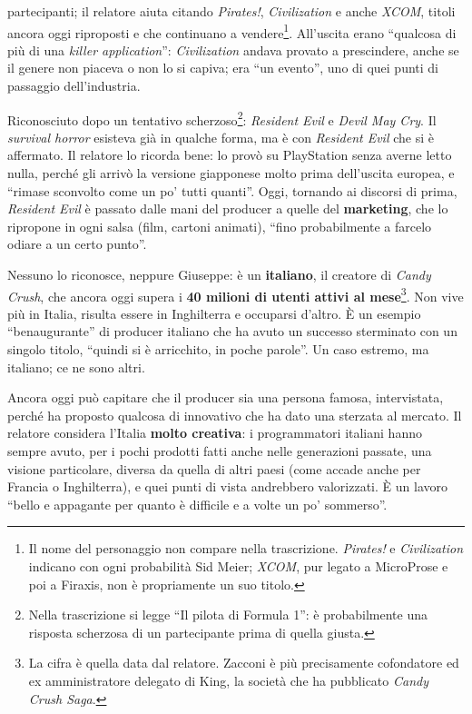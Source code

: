 \begin{description}
        partecipanti; il relatore aiuta citando \emph{Pirates!},
        \emph{Civilization} e anche \emph{XCOM}, titoli ancora oggi riproposti e
        che continuano a vendere\footnote{Il nome del personaggio non compare
        nella trascrizione. \emph{Pirates!} e \emph{Civilization} indicano con
        ogni probabilità Sid Meier; \emph{XCOM}, pur legato a MicroProse e poi a
        Firaxis, non è propriamente un suo titolo.}. All'uscita erano ``qualcosa
        di più di una \emph{killer application}'': \emph{Civilization} andava
        provato a prescindere, anche se il genere non piaceva o non lo si
        capiva; era ``un evento'', uno di quei punti di passaggio
        dell'industria.
  \item[Shinji Mikami.] Riconosciuto dopo un tentativo
        scherzoso\footnote{Nella trascrizione si legge ``Il pilota di Formula
        1'': è probabilmente una risposta scherzosa di un partecipante prima di
        quella giusta.}: \emph{Resident Evil} e \emph{Devil May Cry}. Il
        \emph{survival horror} esisteva già in qualche forma, ma è con
        \emph{Resident Evil} che si è affermato. Il relatore lo ricorda bene:
        lo provò su PlayStation senza averne letto nulla, perché gli arrivò la
        versione giapponese molto prima dell'uscita europea, e ``rimase sconvolto
        come un po' tutti quanti''. Oggi, tornando ai discorsi di prima,
        \emph{Resident Evil} è passato dalle mani del producer a quelle del
        \textbf{marketing}, che lo ripropone in ogni salsa (film, cartoni
        animati), ``fino probabilmente a farcelo odiare a un certo punto''.
  \item[Riccardo Zacconi.] Nessuno lo riconosce, neppure Giuseppe: è un
        \textbf{italiano}, il creatore di \emph{Candy Crush}, che ancora oggi
        supera i \textbf{40 milioni di utenti attivi al mese}\footnote{La cifra è
        quella data dal relatore. Zacconi è più precisamente cofondatore ed ex
        amministratore delegato di King, la società che ha pubblicato
        \emph{Candy Crush Saga}.}. Non vive più in Italia, risulta essere in
        Inghilterra e occuparsi d'altro. È un esempio ``benaugurante'' di
        producer italiano che ha avuto un successo sterminato con un singolo
        titolo, ``quindi si è arricchito, in poche parole''. Un caso estremo, ma
        italiano; ce ne sono altri.
\end{description}
Ancora oggi può capitare che il producer sia una persona famosa, intervistata,
perché ha proposto qualcosa di innovativo che ha dato una sterzata al mercato.
Il relatore considera l'Italia \textbf{molto creativa}: i programmatori italiani
hanno sempre avuto, per i pochi prodotti fatti anche nelle generazioni passate,
una visione particolare, diversa da quella di altri paesi (come accade anche per
Francia o Inghilterra), e quei punti di vista andrebbero valorizzati. È un lavoro
``bello e appagante per quanto è difficile e a volte un po' sommerso''.

